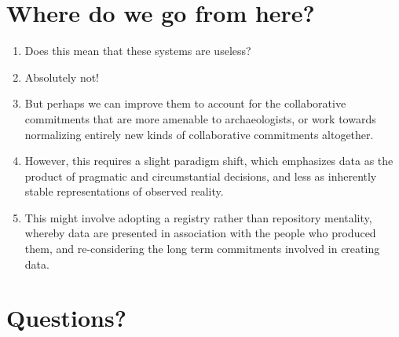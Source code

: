 \documentclass[12pt]{article}
\begin{document}
\section{Where do we go from here?}
\begin{enumerate}
  \item Does this mean that these systems are useless?
  \item Absolutely not!
  \item But perhaps we can improve them to account for the collaborative commitments that are more amenable to archaeologists, or work towards normalizing entirely new kinds of collaborative commitments altogether.
  \item However, this requires a slight paradigm shift, which emphasizes data as the product of pragmatic and circumstantial decisions, and less as inherently stable representations of observed reality.
  \item This might involve adopting a registry rather than repository mentality, whereby data are presented in association with the people who produced them, and re-considering the long term commitments involved in creating data.
\end{enumerate}

\section{Questions?}
\end{document}
